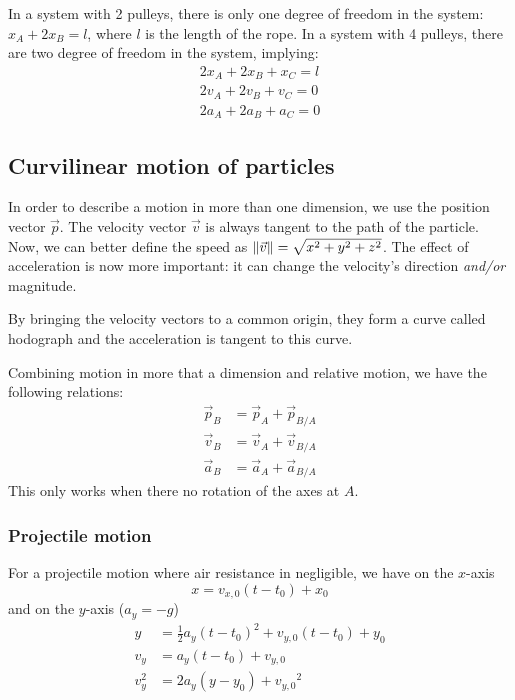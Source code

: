 \documentclass[10pt, twocolumn]{article}
\begin{document}
In a system with 2 pulleys, there is only one degree of freedom in the system: \(x_A + 2x_B = l\), where \(l\) is the length of the rope.
In a system with 4 pulleys, there are two degree of freedom in the system, implying:
\begin{align*}
  2x_A + 2x_B + x_C = l \\
  2v_A + 2v_B + v_C = 0 \\
  2a_A + 2a_B + a_C = 0
\end{align*}

\addtocounter{subsection}{1}
\subsection{Curvilinear motion of particles}
In order to describe a motion in more than one dimension, we use the position vector \(\vec{p}\).
The velocity vector \(\vec{v}\) is always tangent to the path of the particle.
Now, we can better define the speed as \(\left\| \vec{v} \right\| = \sqrt{x^2 + y^2 + z ^2}\).
The effect of acceleration is now more important: it can change the velocity's direction \emph{and/or} magnitude.

\begin{remark}
  By bringing the velocity vectors to a common origin, they form a curve called hodograph and the acceleration is tangent to this curve.
\end{remark}

Combining motion in more that a dimension and relative motion, we have the following relations:
\begin{align*}
  \vec{p}_B & = \vec{p}_A + \vec{p}_{B/A} \\
  \vec{v}_B & = \vec{v}_A + \vec{v}_{B/A} \\
  \vec{a}_B & = \vec{a}_A + \vec{a}_{B/A}
\end{align*}
This only works when there no rotation of the axes at \(A\).


\subsubsection{Projectile motion}
For a projectile motion where air resistance in negligible, we have on the \(x\)-axis
\[
  x = v_{x,0}(t - t_0) + x_0
\]
and on the \(y\)-axis (\(a_y = -g\))
\begin{align*}
  y     & = \frac{1}{2}a_y(t - t_0)^2 + v_{y,0}(t - t_0) + y_0 \\
  v_y   & = a_y(t - t_0) + v_{y,0}                             \\
  v_y^2 & = 2a_y(y - y_0) + {v_{y,0}}^2
\end{align*}
\end{document}
